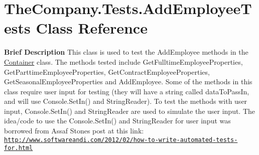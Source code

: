 \hypertarget{class_the_company_1_1_tests_1_1_add_employee_tests}{}\section{The\+Company.\+Tests.\+Add\+Employee\+Tests Class Reference}
\label{class_the_company_1_1_tests_1_1_add_employee_tests}


{\bfseries  Brief Description} This class is used to test the Add\+Employee methods in the \hyperlink{class_the_company_1_1_container}{Container} class. The methods tested include Get\+Fulltime\+Employee\+Properties, Get\+Parttime\+Employee\+Properties, Get\+Contract\+Employee\+Properties, Get\+Seasonal\+Employee\+Properties and Add\+Employee. Some of the methods in this class require user input for testing (they will have a string called data\+To\+Pass\+In, and will use Console.\+Set\+In() and String\+Reader). To test the methods with user input, Console.\+Set\+In() and String\+Reader are used to simulate the user input. The idea/code to use the Console.\+Set\+In() and String\+Reader for user input was borrowed from Assaf Stone\textquotesingle{}s post at this link\+: \href{http://www.softwareandi.com/2012/02/how-to-write-automated-tests-for.html}{\tt http\+://www.\+softwareandi.\+com/2012/02/how-\/to-\/write-\/automated-\/tests-\/for.\+html}  


